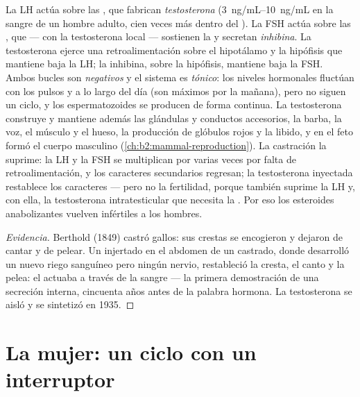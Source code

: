 \begin{proposition}\label{prop:b2:reproductive-hormones:testis}
La LH actúa sobre las , que fabrican
\emph{testosterona} (\qtyrange{3}{10}{ng/mL} en la sangre de un hombre
adulto, cien veces más dentro del ). La FSH actúa sobre las
, que --- con la testosterona local --- sostienen la
 y secretan \emph{inhibina}. La testosterona ejerce una
retroalimentación sobre el hipotálamo y la hipófisis que mantiene baja la
LH; la inhibina, sobre la hipófisis, mantiene baja la FSH. Ambos bucles
son \emph{negativos} y el sistema es \emph{tónico}: los niveles
hormonales fluctúan con los pulsos y a lo largo del día (son máximos por
la mañana), pero no siguen un ciclo, y los espermatozoides se producen de
forma continua. La testosterona construye y mantiene además las glándulas
y conductos accesorios, la barba, la voz, el músculo y el hueso, la
producción de glóbulos rojos y la libido, y en el feto formó el cuerpo
masculino (\cref{ch:b2:mammal-reproduction}). La castración la suprime:
la LH y la FSH se multiplican por varias veces por falta de
retroalimentación, y los caracteres secundarios regresan; la testosterona
inyectada restablece los caracteres --- pero no la fertilidad, porque
también suprime la LH y, con ella, la testosterona intratesticular que
necesita la . Por eso los esteroides anabolizantes
vuelven infértiles a los hombres.
\end{proposition}
\begin{proof}[Evidencia]
Berthold (1849) castró gallos: sus crestas se encogieron y dejaron de
cantar y de pelear. Un  injertado en el abdomen de un castrado,
donde desarrolló un nuevo riego sanguíneo pero ningún nervio, restableció
la cresta, el canto y la pelea: el  actuaba a través de la
sangre --- la primera demostración de una secreción interna, cincuenta
años antes de la palabra hormona. La testosterona se aisló y se sintetizó
en 1935.
\end{proof}

\section{La mujer: un ciclo con un interruptor}

